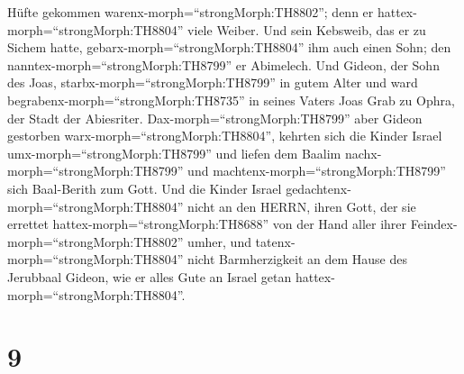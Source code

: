 Hüfte gekommen warenx-morph=``strongMorph:TH8802''; denn er
hattex-morph=``strongMorph:TH8804'' viele Weiber.  Und sein
Kebsweib, das er zu Sichem hatte, gebarx-morph=``strongMorph:TH8804''
ihm auch einen Sohn; den nanntex-morph=``strongMorph:TH8799'' er
Abimelech.  Und Gideon, der Sohn des Joas,
starbx-morph=``strongMorph:TH8799'' in gutem Alter und ward
begrabenx-morph=``strongMorph:TH8735'' in seines Vaters Joas Grab zu
Ophra, der Stadt der Abiesriter. 
Dax-morph=``strongMorph:TH8799'' aber Gideon gestorben
warx-morph=``strongMorph:TH8804'', kehrten sich die Kinder Israel
umx-morph=``strongMorph:TH8799'' und liefen dem Baalim
nachx-morph=``strongMorph:TH8799'' und
machtenx-morph=``strongMorph:TH8799'' sich Baal-Berith zum Gott.
 Und die Kinder Israel
gedachtenx-morph=``strongMorph:TH8804'' nicht an den HERRN, ihren Gott,
der sie errettet hattex-morph=``strongMorph:TH8688'' von der Hand aller
ihrer Feindex-morph=``strongMorph:TH8802'' umher,  und
tatenx-morph=``strongMorph:TH8804'' nicht Barmherzigkeit an dem Hause
des Jerubbaal Gideon, wie er alles Gute an Israel getan
hattex-morph=``strongMorph:TH8804''.

\hypertarget{section-8}{%
\section{9}\label{section-8}}

